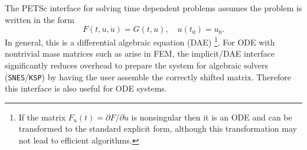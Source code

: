 \vspace{.2cm}

The PETSc interface for solving time dependent problems assumes the problem is written in the form
\[
        F(t,u,\dot{u}) = G(t,u), \quad u(t_0) = u_0.
\]
In general, this is a differential algebraic
equation (DAE) \footnote{If the matrix $F_{\dot{u}}(t) = \partial F
/ \partial \dot{u}$ is nonsingular then it is an ODE and can be
transformed to the standard explicit form, although this transformation
may not lead to efficient algorithms.}. 
For ODE with nontrivial mass matrices such as arise in FEM, the implicit/DAE interface significantly
reduces overhead to prepare the system for algebraic solvers (\lstinline{SNES}/\lstinline{KSP})
by having the user assemble the correctly shifted matrix.  Therefore
this interface is also useful for ODE systems.

